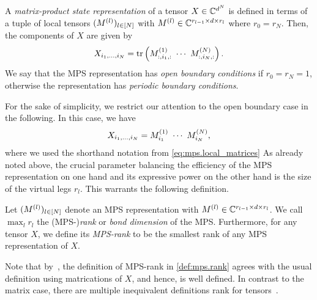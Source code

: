 \begin{definition}%
  \label{def:mps.mps}
  A \emph{matrix-product state representation} of a tensor $X \in {\mathbb{C}}^{d^N}$ is defined in terms of a tuple of local tensors $(M^{(l)})_{l \in [N]}$ with $M^{(l)} \in {\mathbb{C}}^{r_{l - 1} \times d \times r_l}$ where $r_0 = r_N$.
  Then, the components of $X$ are given by
  \[
    \label{eq:mps.periodic_boundary}
    X_{i_1,\ldots,i_N} = \tr \left( M\ind{1}_{:,i_1,:}\ \cdots\  M\ind{N}_{:,i_N,:} \right).
  \]
  We say that the MPS representation has \emph{open boundary conditions} if $r_0 = r_N = 1$, otherwise the representation has \emph{periodic boundary conditions}.
\end{definition}

For the sake of simplicity, we restrict our attention to the open boundary case in the following.
In this case, we have
\[
  \label{eq:mps.open_boundary}
  X_{i_1,\ldots,i_N} = M^{(1)}_{i_1}\ \cdots\  M^{(N)}_{i_N},
\]
where we used the shorthand notation from \cref{eq:mps.local_matrices}
As already noted above, the crucial parameter balancing the efficiency of the MPS representation on one hand and its expressive power on the other hand is the size of the virtual legs $r_l$.
This warrants the following definition.

\begin{definition}%
  \label{def:mps.rank}
  Let $(M^{(l)})_{l \in [N]}$ denote an MPS representation with $M^{(l)} \in {\mathbb{C}}^{r_{l - 1} \times d \times r_l}$.
  We call $\max_l r_l$ the (MPS-)\emph{rank} or \emph{bond dimension} of the MPS.
  Furthermore, for any tensor $X$, we define its \emph{MPS-rank} to be the smallest rank of any MPS representation of $X$.
\end{definition}

Note that by~\cite[Thm.\ 2.2]{Oseledets_2011_TensorTrain}, the definition of MPS-rank in \cref{def:mps.rank} agrees with the usual definition using matrications of $X$, and hence, is well defined.
In contrast to the matrix case, there are multiple inequivalent definitions rank for tensors~\cite{???}.
\\


